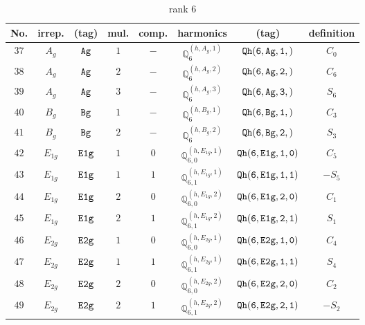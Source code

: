 \documentclass[fleqn,8pt]{jsarticle}
\begin{document}
\begin{table}[ht!]
\begin{center}
\caption{rank 6}
\renewcommand{\arraystretch}{1.3}
\begin{tabular}{cccccccc} \hline \hline
No. & irrep. & (tag) & mul. & comp. & harmonics & (tag) & definition \\ \hline
$ 37 $ & $ A_{g} $ & $ {\tt Ag} $ & $ 1 $ & $ - $ & $ \mathbb{Q}_{6}^{(h,A_{g},1)} $ & $ {\tt Qh(6,Ag,1,)} $ & $ C_{0} $ \\
$ 38 $ & $ A_{g} $ & $ {\tt Ag} $ & $ 2 $ & $ - $ & $ \mathbb{Q}_{6}^{(h,A_{g},2)} $ & $ {\tt Qh(6,Ag,2,)} $ & $ C_{6} $ \\
$ 39 $ & $ A_{g} $ & $ {\tt Ag} $ & $ 3 $ & $ - $ & $ \mathbb{Q}_{6}^{(h,A_{g},3)} $ & $ {\tt Qh(6,Ag,3,)} $ & $ S_{6} $ \\
$ 40 $ & $ B_{g} $ & $ {\tt Bg} $ & $ 1 $ & $ - $ & $ \mathbb{Q}_{6}^{(h,B_{g},1)} $ & $ {\tt Qh(6,Bg,1,)} $ & $ C_{3} $ \\
$ 41 $ & $ B_{g} $ & $ {\tt Bg} $ & $ 2 $ & $ - $ & $ \mathbb{Q}_{6}^{(h,B_{g},2)} $ & $ {\tt Qh(6,Bg,2,)} $ & $ S_{3} $ \\
$ 42 $ & $ E_{1g} $ & $ {\tt E1g} $ & $ 1 $ & $ 0 $ & $ \mathbb{Q}_{6,0}^{(h,E_{1g},1)} $ & $ {\tt Qh(6,E1g,1,0)} $ & $ C_{5} $ \\
$ 43 $ & $ E_{1g} $ & $ {\tt E1g} $ & $ 1 $ & $ 1 $ & $ \mathbb{Q}_{6,1}^{(h,E_{1g},1)} $ & $ {\tt Qh(6,E1g,1,1)} $ & $ - S_{5} $ \\
$ 44 $ & $ E_{1g} $ & $ {\tt E1g} $ & $ 2 $ & $ 0 $ & $ \mathbb{Q}_{6,0}^{(h,E_{1g},2)} $ & $ {\tt Qh(6,E1g,2,0)} $ & $ C_{1} $ \\
$ 45 $ & $ E_{1g} $ & $ {\tt E1g} $ & $ 2 $ & $ 1 $ & $ \mathbb{Q}_{6,1}^{(h,E_{1g},2)} $ & $ {\tt Qh(6,E1g,2,1)} $ & $ S_{1} $ \\
$ 46 $ & $ E_{2g} $ & $ {\tt E2g} $ & $ 1 $ & $ 0 $ & $ \mathbb{Q}_{6,0}^{(h,E_{2g},1)} $ & $ {\tt Qh(6,E2g,1,0)} $ & $ C_{4} $ \\
$ 47 $ & $ E_{2g} $ & $ {\tt E2g} $ & $ 1 $ & $ 1 $ & $ \mathbb{Q}_{6,1}^{(h,E_{2g},1)} $ & $ {\tt Qh(6,E2g,1,1)} $ & $ S_{4} $ \\
$ 48 $ & $ E_{2g} $ & $ {\tt E2g} $ & $ 2 $ & $ 0 $ & $ \mathbb{Q}_{6,0}^{(h,E_{2g},2)} $ & $ {\tt Qh(6,E2g,2,0)} $ & $ C_{2} $ \\
$ 49 $ & $ E_{2g} $ & $ {\tt E2g} $ & $ 2 $ & $ 1 $ & $ \mathbb{Q}_{6,1}^{(h,E_{2g},2)} $ & $ {\tt Qh(6,E2g,2,1)} $ & $ - S_{2} $ \\
 \hline \hline
\end{tabular}
\end{center}
\end{table}
\end{document}

